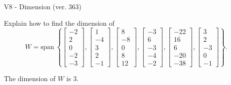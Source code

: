 \begin{exercise}
  \begin{exerciseTitle}V8 - Dimension (ver. 363)\end{exerciseTitle}
  \begin{exerciseStatement}
    Explain how to find the dimension of 
\[W=\mathrm{span}\ \left\{\left[\begin{array}{r}
-2 \\
2 \\
0 \\
-2 \\
-3
\end{array}\right] , \left[\begin{array}{r}
1 \\
-4 \\
3 \\
2 \\
-1
\end{array}\right] , \left[\begin{array}{r}
8 \\
-8 \\
0 \\
8 \\
12
\end{array}\right] , \left[\begin{array}{r}
-3 \\
6 \\
-3 \\
-4 \\
-2
\end{array}\right] , \left[\begin{array}{r}
-22 \\
16 \\
6 \\
-20 \\
-38
\end{array}\right] , \left[\begin{array}{r}
3 \\
2 \\
-3 \\
0 \\
-1
\end{array}\right]\right\}.\]



  \end{exerciseStatement}
  \begin{exerciseAnswer}
   The dimension of \(W\) is  \(3\).
  


  \end{exerciseAnswer}
\end{exercise}
